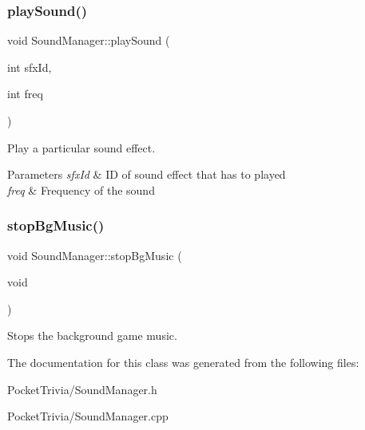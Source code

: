 \subsubsection{\texorpdfstring{playSound()}{playSound()}}
{\footnotesize\ttfamily void Sound\+Manager\+::play\+Sound (\begin{DoxyParamCaption}\item[{int}]{sfx\+Id,  }\item[{int}]{freq }\end{DoxyParamCaption})}



Play a particular sound effect. 


\begin{DoxyParams}{Parameters}
{\em sfx\+Id} & ID of sound effect that has to played \\
\hline
{\em freq} & Frequency of the sound \\
\hline
\end{DoxyParams}
\mbox{\label{class_sound_manager_aaaf5f2a309aef452b8f3b749bce66698}} 
\subsubsection{\texorpdfstring{stopBgMusic()}{stopBgMusic()}}
{\footnotesize\ttfamily void Sound\+Manager\+::stop\+Bg\+Music (\begin{DoxyParamCaption}\item[{void}]{ }\end{DoxyParamCaption})}



Stops the background game music. 



The documentation for this class was generated from the following files\+:\begin{DoxyCompactItemize}
\item 
Pocket\+Trivia/Sound\+Manager.\+h\item 
Pocket\+Trivia/Sound\+Manager.\+cpp\end{DoxyCompactItemize}
